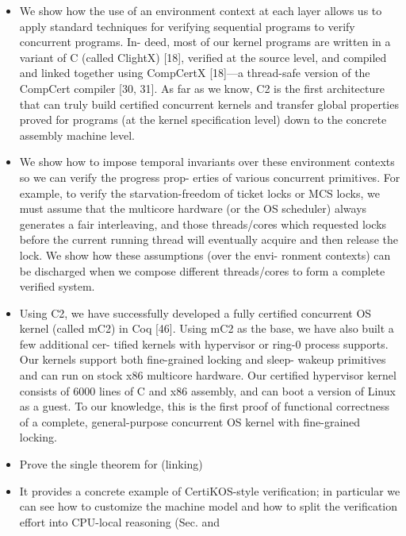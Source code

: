 \begin{itemize}

\item We show how the use of an environment context at each layer allows us to apply standard techniques for verifying sequential programs to verify concurrent programs. In- deed, most of our kernel programs are written in a variant of C (called ClightX) [18], verified at the source level, and compiled and linked together using CompCertX [18]—a thread-safe version of the CompCert compiler [30, 31]. As far as we know, C2 is the first architecture that can truly build certified concurrent kernels and transfer global properties proved for programs (at the kernel specification level) down to the concrete assembly machine level.

\item We show how to impose temporal invariants over these environment contexts so we can verify the progress prop- erties of various concurrent primitives. For example, to verify the starvation-freedom of ticket locks or MCS locks, we must assume that the multicore hardware (or the OS scheduler) always generates a fair interleaving, and those threads/cores which requested locks before the current running thread will eventually acquire and then release the lock. We show how these assumptions (over the envi- ronment contexts) can be discharged when we compose different threads/cores to form a complete verified system.

\item  Using C2, we have successfully developed a fully certified concurrent OS kernel (called mC2) in Coq [46]. Using mC2 as the base, we have also built a few additional cer- tified kernels with hypervisor or ring-0 process supports. Our kernels support both fine-grained locking and sleep- wakeup primitives and can run on stock x86 multicore hardware. Our certified hypervisor kernel consists of 6000 lines of C and x86 assembly, and can boot a version of Linux as a guest. To our knowledge, this is the first proof of functional correctness of a complete, general-purpose concurrent OS kernel with fine-grained locking.

\item Prove the single theorem for (linking)

\item It provides a concrete example of CertiKOS-style verification; in particular we can see how to customize the machine model    and how to split the verification effort into CPU-local reasoning (Sec. and 
  

\end{itemize}
